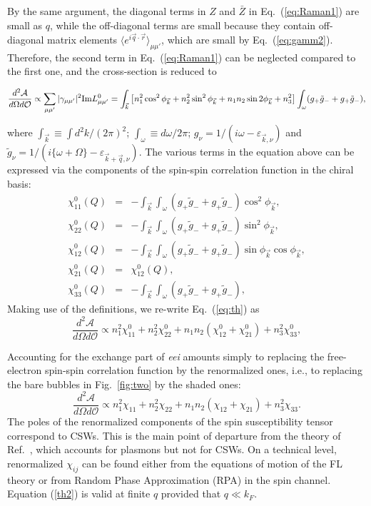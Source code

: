 \documentclass[prb,aps,twocolumn]{revtex4}
\newcommand{\beq}{\begin{equation}}
\newcommand{\eeq}{\end{equation}}
\newcommand{\bea}{\begin{eqnarray}}
\newcommand{\eea}{\end{eqnarray}}
\newcommand{\e}{\varepsilon}
\newcommand{\bk}{{\vec k}}
\newcommand{\bq}{{\vec q}}
\newcommand{\nn}{\nonumber}
\begin{document}
By the same argument, the diagonal terms in $Z$ and $\bar Z$ in
Eq.~(\ref{eq:Raman1}) are small as $q$, while the off-diagonal
terms are small because they contain off-diagonal matrix elements
$\langle e^{i\bq\cdot\vec r}\rangle_{\mu\mu'}$, which are small by
Eq.~(\ref{eq:gamm2}). Therefore, the second term in
Eq.~(\ref{eq:Raman1}) can be neglected compared to the first one,
and the cross-section  is
reduced to
\begin{widetext}
\beq\label{eq:th} \frac{d^2\mathcal{A}}{d\Omega
d\mathcal{O}}\propto  \sum_{\mu\mu'}|\gamma_{\mu\mu'}|^2{\rm
Im}L^0_{\mu\mu'} = \int_{\bk}\left[n_1^2\cos^2\phi_\bk +
n_2^2\sin^2\phi_\bk+n_1n_2\sin2\phi_\bk + n_3^2\right]
\int_\omega(g_+\tilde g_-+g_+\tilde g_-), \eeq
\end{widetext}
where $\int_{\bk}\equiv\int{d^2k}/{(2\pi)^2}$;
$\int_{\omega}\equiv d\omega/2\pi$;
$g_{\nu}=1/(i\omega-\e_{\bk,\nu})$ and $\tilde
g_{\nu}=1/(i\{\omega+\Omega\}-\e_{\bk+\bq,\nu})$. The various
terms in the equation above can be expressed via the components of
the spin-spin correlation function in the chiral basis:
\bea\label{eq:tt}
\chi^{0}_{11}(Q)&=&-\int_\bk\int_\omega(g_+\tilde g_-+g_+\tilde g_-)\cos^2\phi_{\bk},\nn\\
\chi^{0}_{22}(Q)&=&-\int_\bk\int_\omega(g_+\tilde g_-+g_+\tilde g_-)\sin^2\phi_{\bk},\nn\\
\chi^{0}_{12}(Q)&=&-\int_\bk\int_\omega(g_+\tilde g_-+g_+\tilde g_-)\sin\phi_{\bk}\cos\phi_{\bk},\nn\\
\chi^{0}_{21}(Q)&=&{\chi^0_{12}(Q)},\nn\\
\chi^{0}_{33}(Q)&=&-\int_\bk\int_\omega(g_+\tilde g_-+g_+\tilde
g_-), \eea Making use of the definitions, we re-write
Eq.~(\ref{eq:th}) as \beq \frac{d^2\mathcal{A}}{d\Omega
d\mathcal{O}}\propto n_1^2\chi^0_{11} +
n_2^2\chi^0_{22}+n_1n_2(\chi^0_{12}+\chi^0_{21}) +
n_3^2\chi^0_{33}, \label{th1} \eeq

Accounting for the exchange part of {\em eei} amounts simply to
replacing the free-electron spin-spin correlation function by the
renormalized ones, i.e., to replacing the bare bubbles in
Fig.~\ref{fig:two} by the shaded ones: \beq
\frac{d^2\mathcal{A}}{d\Omega d\mathcal{O}}\propto n_1^2\chi_{11}
+ n_2^2\chi_{22}+n_1n_2(\chi_{12}+\chi_{21}) + n_3^2\chi_{33}.
\label{th2} \eeq The poles of the renormalized components of the
spin susceptibility tensor correspond to CSWs. This is the main
point of departure from the theory of Ref.~,
which accounts for plasmons but not for CSWs. On a technical
level, renormalized $\chi_{ij}$ can be found either from the
equations of motion of the FL theory
\cite{Shekhter,Ali1,kumar:2017} or from Random Phase Approximation
(RPA) in the spin channel. \cite{SM1}
Equation (\ref{th2}) is valid
at finite $q$ provided that $q\ll
k_F$.
\end{document}
